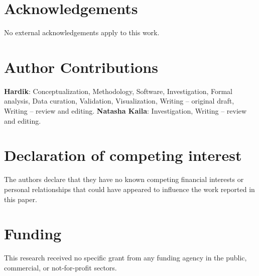 \documentclass[manuscript,review]{acmart}
\begin{document}
\section*{Acknowledgements}
No external acknowledgements apply to this work.

\section*{Author Contributions}
\textbf{Hardik}: Conceptualization, Methodology, Software, Investigation, Formal
analysis, Data curation, Validation, Visualization, Writing -- original draft, Writing --
review and editing. \textbf{Natasha Kaila}: Investigation, Writing -- review and editing.

\section*{Declaration of competing interest}
The authors declare that they have no known competing financial interests or personal
relationships that could have appeared to influence the work reported in this paper.

\section*{Funding}
This research received no specific grant from any funding agency in the public,
commercial, or not-for-profit sectors.
\end{document}
